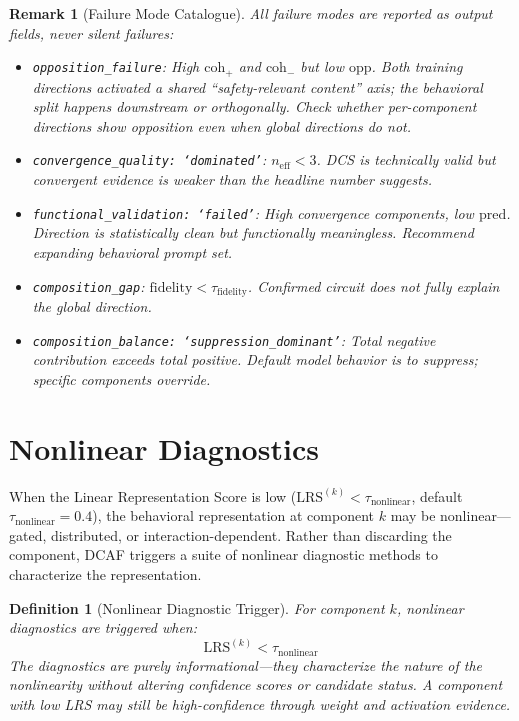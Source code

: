 \documentclass[11pt]{article}
\newtheorem{definition}{Definition}[section]
\newtheorem{remark}{Remark}[section]
\begin{document}
\begin{remark}[Failure Mode Catalogue]
All failure modes are reported as output fields, never silent failures:
\begin{itemize}[nosep]
\item \texttt{opposition\_failure}: High $\text{coh}_+$ and $\text{coh}_-$ but low $\text{opp}$. Both training directions activated a shared ``safety-relevant content'' axis; the behavioral split happens downstream or orthogonally. Check whether per-component directions show opposition even when global directions do not.
\item \texttt{convergence\_quality: `dominated'}: $n_{\text{eff}} < 3$. DCS is technically valid but convergent evidence is weaker than the headline number suggests.
\item \texttt{functional\_validation: `failed'}: High convergence components, low $\text{pred}$. Direction is statistically clean but functionally meaningless. Recommend expanding behavioral prompt set.
\item \texttt{composition\_gap}: $\text{fidelity} < \tau_{\text{fidelity}}$. Confirmed circuit does not fully explain the global direction.
\item \texttt{composition\_balance: `suppression\_dominant'}: Total negative contribution exceeds total positive. Default model behavior is to suppress; specific components override.
\end{itemize}
\end{remark}

\section{Nonlinear Diagnostics}
\label{app:nonlinear}

When the Linear Representation Score is low ($\text{LRS}^{(k)} < \tau_{\text{nonlinear}}$, default $\tau_{\text{nonlinear}} = 0.4$), the behavioral representation at component $k$ may be nonlinear---gated, distributed, or interaction-dependent. Rather than discarding the component, DCAF triggers a suite of nonlinear diagnostic methods to characterize the representation.

\begin{definition}[Nonlinear Diagnostic Trigger]
\label{def:nonlinear-diagnostic-trigger}
For component $k$, nonlinear diagnostics are triggered when:
\begin{equation}
\text{LRS}^{(k)} < \tau_{\text{nonlinear}}
\end{equation}
The diagnostics are purely informational---they characterize the nature of the nonlinearity without altering confidence scores or candidate status. A component with low LRS may still be high-confidence through weight and activation evidence.
\end{definition}
\end{document}

